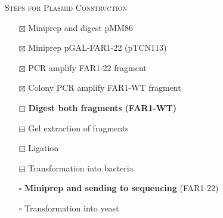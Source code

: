 \documentclass{beamer}
\begin{document}
\begin{frame}
    \begin{center}
        {\large \textsc{Steps for Plasmid Construction}}
    \end{center}
        \begin{itemize}
            \item[$\boxtimes$]  Miniprep and digest pMM86
            \item[$\boxtimes$]  Miniprep pGAL-FAR1-22 (pTCN113)
            \item[$\boxtimes$]  PCR amplify FAR1-22 fragment
            \item[$\boxtimes$]  Colony PCR amplify FAR1-WT fragment
            \item[$\boxminus$]  \textbf{Digest both fragments} \textbf{(FAR1-WT)}
            \item[$\boxminus$]  Gel extraction of fragments
            \item[$\boxminus$]  Ligation 
            \item[$\boxminus$] Transformation into bacteria
            \item[$\square$] \textbf{Miniprep and sending to sequencing} (FAR1-22)
            \item[$\square$] Transformation into yeast
        \end{itemize}
\end{frame}
\end{document}
